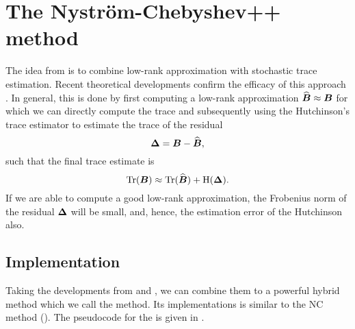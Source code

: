 \chapter{The Nystr\"om-Chebyshev++ method}
\label{chp:4-nystromchebyshev}

The idea from \cite{lin2017randomized} is to combine low-rank approximation
with stochastic trace estimation. Recent theoretical developments confirm the
efficacy of this approach \cite{meyer2021hutch,persson2022hutch}. In general,
this is done by first computing a low-rank approximation $\widehat{\boldsymbol{B}} \approx \boldsymbol{B}$
for which we can directly compute the trace and subsequently using the
Hutchinson's trace estimator 
to estimate the trace of the residual
\begin{equation}
    \boldsymbol{\Delta} = \boldsymbol{B} - \widehat{\boldsymbol{B}},
    \label{equ:4-nystromchebyshev-residual}
\end{equation}
such that the final trace estimate is
\begin{equation}
    \operatorname{Tr}(\boldsymbol{B}) \approx \operatorname{Tr}(\widehat{\boldsymbol{B}}) + \operatorname{H}(\boldsymbol{\Delta}).
    \label{equ:4-nystromchebyshev-hutch-pp}
\end{equation}
If we are able to compute a good low-rank approximation, the Frobenius norm
of the residual $\boldsymbol{\Delta}$ will be small, and, hence, the estimation
error of the Hutchinson  also.


\section{Implementation}
\label{sec:4-nystromchebyshev-implementation}

Taking the developments from  and ,
we can combine them to a powerful hybrid method which we call the 
method. Its implementations is similar to the \gls{NC} method ().
The pseudocode for the  is given in .

